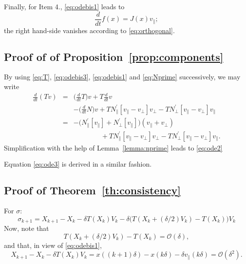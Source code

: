 \documentclass[10pt]{article}
\newcommand{\Npperp}{N^\prime_\perp}
\newcommand{\Nppar}{N^\prime_\|}
\newcommand{\vperp}{v_\perp}
\newcommand{\vpar}{v_\|}
\begin{document}
Finally, for Item 4., \eqref{eq:odebis1} leads to
\[
\frac{d}{dt} f(x) = J(x) \vpar;
\]
the right hand-side vanishes according to \eqref{eq:orthogonal}.
\subsection{Proof of  of Proposition~\ref{prop:components}}

By using \eqref{eq:T}, \eqref{eq:odebis3}, \eqref{eq:odebis1} and \eqref{eq:Nprime} successively, we may write
\begin{eqnarray*}
\frac{d}{dt}( T v )& =& \Big(\frac{d}{dt}T\Big)v+T\frac{d}{dt}v\\
&& -\Big(\frac{d}{dt} N\Big) v+T\Nppar[\vpar-\vperp]\vperp-T\Npperp [\vpar-\vperp]\vpar\\
&=& -\big(\Nppar[\vpar]+\Npperp[\vpar]\big) (\vpar+\vperp)\\
&&\qquad\qquad+T\Nppar[\vpar-\vperp]\vperp-T\Npperp [\vpar-\vperp]\vpar.
\end{eqnarray*}
Simplification with the help of Lemma~\ref{lemma:nprime} leads to \eqref{eq:ode2}

 Equation \eqref{eq:ode3} is derived in a similar fashion.

\subsection{Proof of Theorem~\ref{th:consistency}}


For  $\sigma$:
%
\[\sigma_{k+1}  =
X_{k+1}-X_k -\delta T(X_k)V_k-
\delta \big(T(X_k+(\delta/2)V_k)-T(X_k)\big)V_k
\]
%
Now, note that
\[
T(X_k+(\delta/2)V_k)-T(X_k)= \mathcal{O}(\delta),
\]
and that, in view of \eqref{eq:odebis1},
\[
X_{k+1}-X_k -\delta T(X_k)V_k =x((k+1)\delta)-x(k\delta) -\delta \vpar(k\delta) = \mathcal{O}(\delta^2).
\]
\end{document}
